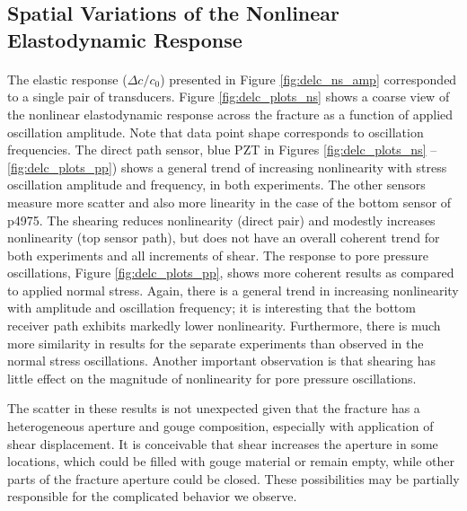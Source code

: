 \documentclass[letterpaper,10pt]{article}
\begin{document}
\clearpage


\subsection{Spatial Variations of the Nonlinear Elastodynamic Response}
\paragraph{}
The elastic response ($ \Delta c/c_0 $) presented in Figure \ref{fig:delc_ns_amp} corresponded to a single pair of transducers. 
Figure \ref{fig:delc_plots_ns} shows a coarse view of the nonlinear elastodynamic response across the fracture as a function of applied oscillation amplitude. Note that data point shape corresponds to oscillation frequencies. The direct path sensor, blue PZT in Figures \ref{fig:delc_plots_ns} -- \ref{fig:delc_plots_pp}) shows a general trend of increasing nonlinearity with stress oscillation amplitude and frequency, in both experiments. The other sensors measure more scatter and also more linearity in the case of the bottom sensor of p4975. The shearing reduces nonlinearity (direct pair) and modestly increases nonlinearity (top sensor path), but does not have an overall coherent trend for both experiments and all increments of shear.
The response to pore pressure oscillations, Figure \ref{fig:delc_plots_pp}, shows more coherent results as compared to applied normal stress. Again, there is a general trend in increasing nonlinearity with amplitude and oscillation frequency; it is interesting that the bottom receiver path exhibits markedly lower nonlinearity. Furthermore, there is much more similarity in results for the separate experiments than observed in the normal stress oscillations. Another important observation is that shearing has little effect on the magnitude of nonlinearity for pore pressure oscillations.

The scatter in these results is not unexpected given that the fracture has a heterogeneous aperture and gouge composition, especially with application of shear displacement. It is conceivable that shear increases the aperture in some locations, which could be filled with gouge material or remain empty, while other parts of the fracture aperture could be closed. These possibilities may be partially responsible for the complicated behavior we observe.
\end{document}
